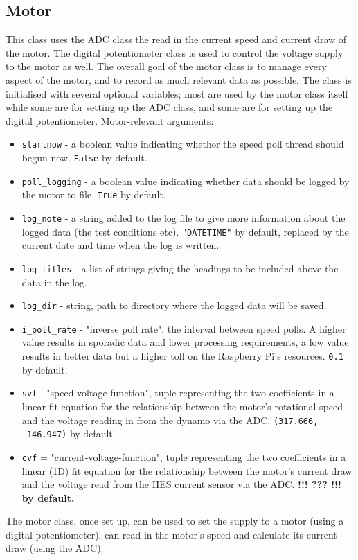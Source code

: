 \documentclass[twoside,a4]{report}
\def\br{\newline \newline \noindent}
\def\cbh{\large\bfseries !!! ??? !!! \normalsize\normalfont}
\begin{document}
	\subsection*{Motor} %
	This class uses the ADC class the read in the current speed and current draw of the motor. The digital potentiometer class is used to control the voltage supply to the motor as well. The overall goal of the motor class is to manage every aspect of the motor, and to record as much relevant data as possible. \br
	The class is initialised with several optional variables; most are used by the motor class itself while some are for setting up the ADC class, and some are for setting up the digital potentiometer.\br
	Motor-relevant arguments:
	\begin{itemize}
		\item \texttt{startnow} - a boolean value indicating whether the speed poll thread should begun now. \texttt{False} by default.
		\item \texttt{poll\_logging} - a boolean value indicating whether data should be logged by the motor to file. \texttt{True} by default.
		\item \texttt{log\_note} - a string added to the log file to give more information about the logged data (the test conditions etc). \texttt{"DATETIME"} by default, replaced by the current date and time when the log is written.
		\item \texttt{log\_titles} - a list of strings giving the headings to be included above the data in the log.
		\item \texttt{log\_dir} - string, path to directory where the logged data will be saved.
		\item \texttt{i\_poll\_rate} - "inverse poll rate", the interval between speed polls. A higher value results in sporadic data and lower processing requirements, a low value results in better data but a higher toll on the Raspberry Pi's resources. \texttt{0.1} by default.
		\item \texttt{svf} - "speed-voltage-function", tuple representing the two coefficients in a linear fit equation for the relationship between the motor's rotational speed and the voltage reading in from the dynamo via the ADC. \texttt{(317.666, -146.947)} by default.
		\item \texttt{cvf} = "current-voltage-function", tuple representing the two coefficients in a linear (1D) fit equation for the relationship between the motor's current draw and the voltage read from the HES current sensor via the ADC. \cbh by default.
	\end{itemize}
	The motor class, once set up, can be used to set the supply to a motor (using a digital potentiometer), can read in the motor's speed and calculate its current draw (using the ADC).
	
\end{document}
